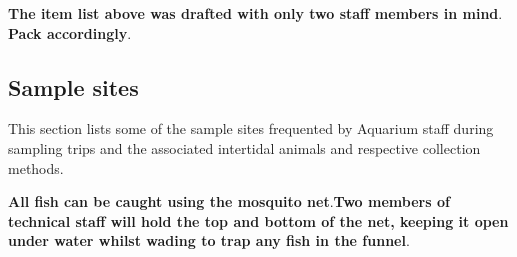 \documentclass[
  letterpaper,
  DIV=11,
  numbers=noendperiod]{scrreprt}
\begin{document}
\textbf{The item list above was drafted with only two staff members in
mind}. \textbf{Pack accordingly}.

\hypertarget{sample-sites}{%
\subsection{Sample sites}\label{sample-sites}}

This section lists some of the sample sites frequented by Aquarium staff
during sampling trips and the associated intertidal animals and
respective collection methods.

\textbf{All fish can be caught using the mosquito net}.\textbf{Two
members of technical staff will hold the top and bottom of the net,
keeping it open under water whilst wading to trap any fish in the
funnel}.
\end{document}
